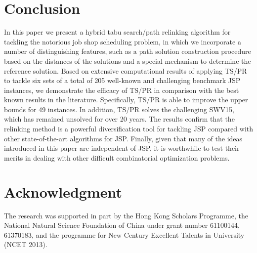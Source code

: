\documentclass[authoryear,12pt]{elsarticle}
\begin{document}
\begin{table}[!h]
\begin{scriptsize}
{\begin{tabular}
\hline
\end{tabular}
}
\end{scriptsize}
\end{table}





\section{Conclusion}
\label{sec conclusions}
In this paper we present a hybrid tabu search/path relinking algorithm for tackling the notorious job shop scheduling problem, in which we incorporate a number of distinguishing features, such as a path solution construction procedure based on the distances of the solutions and a special mechanism to determine the reference solution. Based on extensive computational results of applying TS/PR to tackle six sets of a total of 205 well-known and challenging benchmark JSP instances, we demonstrate the efficacy of TS/PR in comparison with the best known results in the literature. Specifically, TS/PR is able to improve the upper bounds for 49 instances. In addition, TS/PR solves the challenging SWV15, which has remained unsolved for over 20 years.
The results confirm that the relinking method is a powerful diversification tool for tackling JSP compared with other state-of-the-art algorithms for JSP. Finally, given that many of the ideas introduced in this paper are independent of JSP, it is worthwhile to test their merits in dealing with other difficult combinatorial optimization problems.

\section*{Acknowledgment}
The research was supported in part by the Hong Kong Scholars Programme, the National Natural Science Foundation of China under grant number 61100144, 61370183, and the programme for New Century Excellent Talents in University (NCET 2013).



\end{document}
